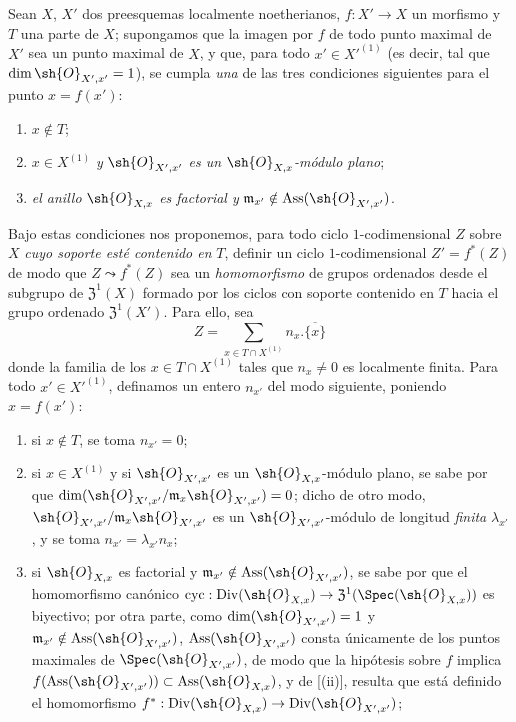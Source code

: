 \begin{env}[21.10.1]
\label{IV.21.10.1}

Sean $X$, $X'$ dos preesquemas localmente noetherianos, $f:X'\to X$ un morfismo y $T$ una parte de $X$;
supongamos que la imagen por $f$ de todo punto maximal de $X'$ sea un punto maximal de $X$, y que, para todo $x'\in X'^{(1)}$ (es decir, tal que $\dim\sh{O}_{X',x'}=1$), se cumpla \emph{una} de las tres condiciones siguientes para el punto $x=f(x')$:
\begin{enumerate}[label=(\roman*)]
  \item $x\notin T$;
  \item $x\in X^{(1)}$ \emph{y} $\sh{O}_{X',x'}$ \emph{es un} $\sh{O}_{X,x}$\emph{-módulo plano};
  \item \emph{el anillo} $\sh{O}_{X,x}$ \emph{es factorial y} $\mathfrak{m}_{x'}\notin\operatorname{Ass}(\sh{O}_{X',x'})$.
\end{enumerate}
Bajo estas condiciones nos proponemos, para todo ciclo $1$-codimensional $Z$ sobre $X$ \emph{cuyo soporte esté contenido en} $T$, definir un ciclo $1$-codimensional $Z'=f^*(Z)$ 
de modo que $Z\leadsto f^*(Z)$ sea un \emph{homomorfismo} de grupos ordenados desde el subgrupo de $\mathfrak{Z}^1(X)$ formado por los ciclos con soporte contenido en $T$ hacia el grupo ordenado $\mathfrak{Z}^1(X')$.
Para ello, sea
\[
\label{IV.21.10.1.1}
  Z=\sum_{x\in T\cap X^{(1)}}n_x.\overline{\{x\}}
  \tag{21.10.1.1}
\]
donde la familia de los $x\in T\cap X^{(1)}$ tales que $n_x\neq0$ es localmente finita.
Para todo $x'\in X'^{(1)}$, definamos un entero $n_{x'}$ del modo siguiente, poniendo $x=f(x')$:
\begin{enumerate}[label=\arabic*\textsuperscript{o}]
  \item si $x\notin T$, se toma $n_{x'}=0$;
  \item si $x\in X^{(1)}$ y si $\sh{O}_{X',x'}$ es un $\sh{O}_{X,x}$-módulo plano, se sabe por  que $\dim(\sh{O}_{X',x'}/\mathfrak{m}_x\sh{O}_{X',x'})=0$; dicho de otro modo, $\sh{O}_{X',x'}/\mathfrak{m}_x\sh{O}_{X',x'}$ es un $\sh{O}_{X',x'}$-módulo de longitud \emph{finita} $\lambda_{x'}$, y se toma $n_{x'}=\lambda_{x'}n_x$;
  \item si $\sh{O}_{X,x}$ es factorial y $\mathfrak{m}_{x'}\notin\operatorname{Ass}(\sh{O}_{X',x'})$, se sabe por  que el homomorfismo canónico $\operatorname{cyc}:\operatorname{Div}(\sh{O}_{X,x})\to\mathfrak{Z}^1(\Spec(\sh{O}_{X,x}))$ es biyectivo; por otra parte, como $\dim(\sh{O}_{X',x'})=1$ y $\mathfrak{m}_{x'}\notin\operatorname{Ass}(\sh{O}_{X',x'})$, $\operatorname{Ass}(\sh{O}_{X',x'})$ consta únicamente de los puntos maximales de $\Spec(\sh{O}_{X',x'})$, de modo que la hipótesis sobre $f$ implica $f(\operatorname{Ass}(\sh{O}_{X',x'}))\subset\operatorname{Ass}(\sh{O}_{X,x})$, y de [(ii)], resulta que está definido el homomorfismo $f^*:\operatorname{Div}(\sh{O}_{X,x})\to\operatorname{Div}(\sh{O}_{X',x'})$;

\end{enumerate}
\end{env}
